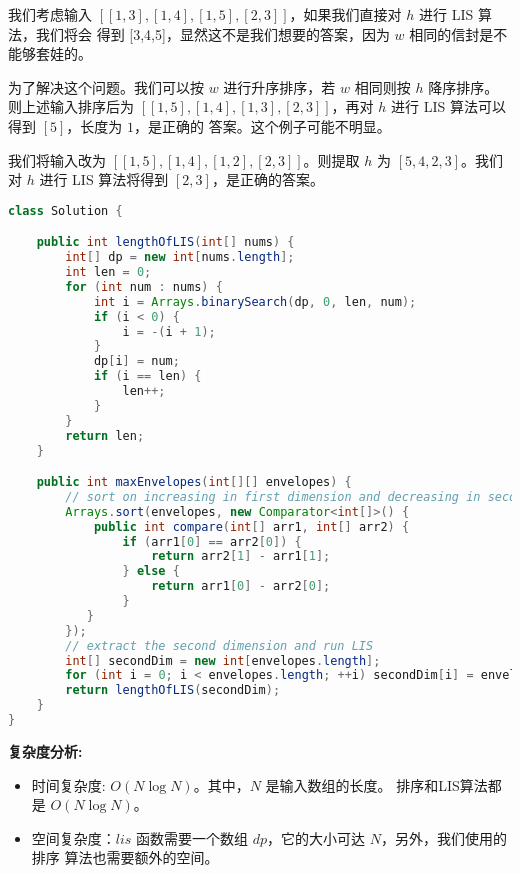 \documentclass[a4paper]{article}
\begin{document}
我们考虑输入 $[[1,3],[1,4],[1,5],[2,3]]$，如果我们直接对 $h$ 进行 LIS 算法，我们将会
得到 [3,4,5]，显然这不是我们想要的答案，因为 $w$ 相同的信封是不能够套娃的。

为了解决这个问题。我们可以按 $w$ 进行升序排序，若 $w$ 相同则按 $h$ 降序排序。则上述输入排序后为
$[[1,5],[1,4],[1,3],[2,3]]$，再对 $h$ 进行 LIS 算法可以得到 $[5]$，长度为 $1$，是正确的
答案。这个例子可能不明显。

我们将输入改为 $[[1,5],[1,4],[1,2],[2,3]]$。则提取 $h$ 为 $[5,4,2,3]$。我们对 $h$ 进行
LIS 算法将得到 $[2,3]$，是正确的答案。

\begin{lstlisting}[language=java]
class Solution {

    public int lengthOfLIS(int[] nums) {
        int[] dp = new int[nums.length];
        int len = 0;
        for (int num : nums) {
            int i = Arrays.binarySearch(dp, 0, len, num);
            if (i < 0) {
                i = -(i + 1);
            }
            dp[i] = num;
            if (i == len) {
                len++;
            }
        }
        return len;
    }

    public int maxEnvelopes(int[][] envelopes) {
        // sort on increasing in first dimension and decreasing in second
        Arrays.sort(envelopes, new Comparator<int[]>() {
            public int compare(int[] arr1, int[] arr2) {
                if (arr1[0] == arr2[0]) {
                    return arr2[1] - arr1[1];
                } else {
                    return arr1[0] - arr2[0];
                }
           }
        });
        // extract the second dimension and run LIS
        int[] secondDim = new int[envelopes.length];
        for (int i = 0; i < envelopes.length; ++i) secondDim[i] = envelopes[i][1];
        return lengthOfLIS(secondDim);
    }
}
\end{lstlisting}

\noindent
\textbf{复杂度分析: }

\begin{itemize}
    \item 时间复杂度: $O(N \log N)$。其中，$N$ 是输入数组的长度。
    排序和LIS算法都是 $O(N \log N)$。
    \item 空间复杂度：$lis$ 函数需要一个数组 $dp$，它的大小可达 $N$，另外，我们使用的排序
    算法也需要额外的空间。
\end{itemize}
\end{document}
